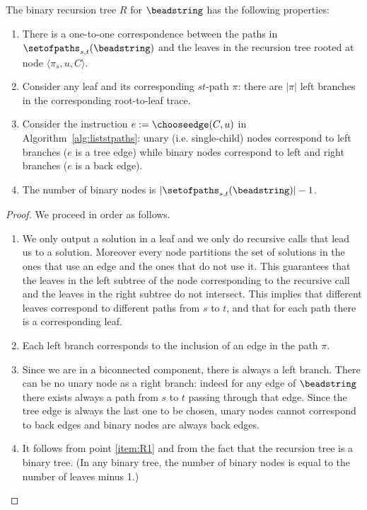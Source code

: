 \begin{lemma}
\label{lem:properties_recursion}
The binary recursion tree $R$ for $\beadstring$ has the following properties: 
\begin{enumerate}
	\setlength{\itemsep}{0pt} 
\item \label{item:R1} There is a one-to-one correspondence between the
  paths in $\setofpaths_{s,t}(\beadstring)$ and the leaves in the recursion
  tree rooted at node $\langle \pi_s, u, C \rangle$.
\item \label{item:R2} Consider any leaf and its corresponding $st$-path
  $\pi$: there are $|\pi|$ left branches in
  the corresponding root-to-leaf trace.
\item \label{item:R3} Consider the instruction $e:=\chooseedge(C,u)$
  in Algorithm~\ref{alg:liststpaths}: unary (i.e.\mbox{} single-child)
  nodes correspond to left branches ($e$ is a tree edge) while binary
  nodes correspond to left and right branches ($e$ is a back
  edge).
\item \label{item:R4} The number of binary nodes is
  $|\setofpaths_{s,t}(\beadstring)| - 1$.
\end{enumerate}
\end{lemma}
\begin{proof}
We proceed in order as follows.
\begin{enumerate}
\item We only output a solution in a leaf and we only do recursive
  calls that lead us to a solution. Moreover every node partitions the
  set of solutions in the ones that use an edge and the ones that do
  not use it. This guarantees that the leaves in the left subtree of
  the node corresponding to the recursive call and the leaves in the
  right subtree do not intersect. This implies that different leaves
  correspond to different paths from $s$ to $t$, and that for each
  path there is a corresponding leaf.
\item Each left branch corresponds to the inclusion of an edge in the
  path $\pi$.
\item Since we are in a biconnected component, there is always a left
  branch. There can be no unary node as a right branch: indeed for any
  edge of $\beadstring$ there exists always a path from $s$ to $t$
  passing through that edge. Since the tree edge is always the last
  one to be chosen, unary nodes cannot correspond to back edges and
  binary nodes are always back edges.
\item It follows from point \ref{item:R1} and from the fact that the recursion tree is
  a binary tree. (In any binary tree, the number of binary nodes is
  equal to the number of leaves minus 1.)
\end{enumerate}
\end{proof}

